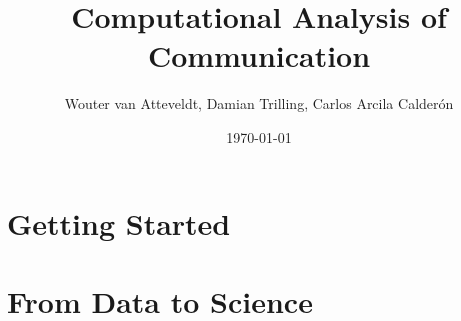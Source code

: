 \documentclass[a4paper,12pt]{book}
\begin{document}
\author{Wouter van Atteveldt, Damian Trilling, Carlos Arcila Calder\'on}
\title{Computational Analysis of Communication}
\date{\today}

\frontmatter
\maketitle
\tableofcontents

\mainmatter

\part{Getting Started}

\setcounter{chapter}{1}



\setcounter{chapter}{5}


\part{From Data to Science}

\setcounter{chapter}{6}


\setcounter{chapter}{8}



\backmatter

\begin{small}
\printbibliography
\end{small}
\end{document}
